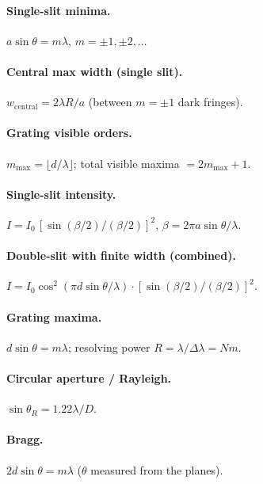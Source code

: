 \documentclass[11pt]{article}
\begin{document}
\paragraph{Single-slit minima.} $a\sin\theta = m\lambda$, $m = \pm 1,\pm 2,\dots$
\paragraph{Central max width (single slit).} $w_{\text{central}} = 2\lambda R/a$ (between $m=\pm 1$ dark fringes).
\paragraph{Grating visible orders.} $m_{\max} = \lfloor d/\lambda\rfloor$; total visible maxima $=2m_{\max}+1$.
\paragraph{Single-slit intensity.}
$I = I_0\,[\sin(\beta/2)/(\beta/2)]^{2}$, $\beta = 2\pi a\sin\theta/\lambda$.
\paragraph{Double-slit with finite width (combined).}
$I = I_0\cos^{2}(\pi d\sin\theta/\lambda)\cdot[\sin(\beta/2)/(\beta/2)]^{2}$.
\paragraph{Grating maxima.} $d\sin\theta = m\lambda$; resolving power $R = \lambda/\Delta\lambda = Nm$.
\paragraph{Circular aperture / Rayleigh.} $\sin\theta_R = 1.22\lambda/D$.
\paragraph{Bragg.} $2 d\sin\theta = m\lambda$ ($\theta$ measured from the planes).

\end{document}
